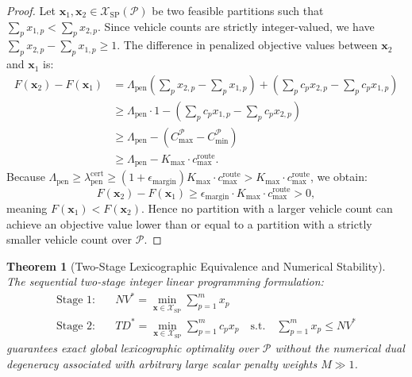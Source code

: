 \documentclass{article}
\newtheorem{theorem}{Theorem}
\begin{document}
\begin{proof}
Let $\mathbf{x}_1, \mathbf{x}_2 \in \mathcal{X}_{\text{SP}}(\mathcal{P})$ be two feasible partitions such that $\sum_{p} x_{1,p} < \sum_{p} x_{2,p}$. Since vehicle counts are strictly integer-valued, we have $\sum_{p} x_{2,p} - \sum_{p} x_{1,p} \ge 1$.
The difference in penalized objective values between $\mathbf{x}_2$ and $\mathbf{x}_1$ is:
\begin{align}
F(\mathbf{x}_2) - F(\mathbf{x}_1) &= \Lambda_{\text{pen}} \left(\sum_p x_{2,p} - \sum_p x_{1,p}\right) + \left(\sum_p c_p x_{2,p} - \sum_p c_p x_{1,p}\right) \\
&\ge \Lambda_{\text{pen}} \cdot 1 - \left(\sum_p c_p x_{1,p} - \sum_p c_p x_{2,p}\right) \\
&\ge \Lambda_{\text{pen}} - (C_{\max}^{\mathcal{P}} - C_{\min}^{\mathcal{P}}) \\
&\ge \Lambda_{\text{pen}} - K_{\max} \cdot c_{\max}^{\text{route}}.
\end{align}
Because $\Lambda_{\text{pen}} \ge \lambda_{\text{pen}}^{\text{cert}} \ge (1 + \epsilon_{\text{margin}}) K_{\max} \cdot c_{\max}^{\text{route}} > K_{\max} \cdot c_{\max}^{\text{route}}$, we obtain:
\begin{equation}
F(\mathbf{x}_2) - F(\mathbf{x}_1) \ge \epsilon_{\text{margin}} \cdot K_{\max} \cdot c_{\max}^{\text{route}} > 0,
\end{equation}
meaning $F(\mathbf{x}_1) < F(\mathbf{x}_2)$. Hence no partition with a larger vehicle count can achieve an objective value lower than or equal to a partition with a strictly smaller vehicle count over $\mathcal{P}$.
\end{proof}

\begin{theorem}[Two-Stage Lexicographic Equivalence and Numerical Stability]
The sequential two-stage integer linear programming formulation:
\begin{align}
\text{Stage 1:} \quad &NV^* = \min_{\mathbf{x} \in \mathcal{X}_{\text{SP}}} \sum_{p=1}^m x_p \\
\text{Stage 2:} \quad &TD^* = \min_{\mathbf{x} \in \mathcal{X}_{\text{SP}}} \sum_{p=1}^m c_p x_p \quad \text{s.t.} \quad \sum_{p=1}^m x_p \le NV^*
\end{align}
guarantees exact global lexicographic optimality over $\mathcal{P}$ without the numerical dual degeneracy associated with arbitrary large scalar penalty weights $M \gg 1$.
\end{theorem}
\end{document}
